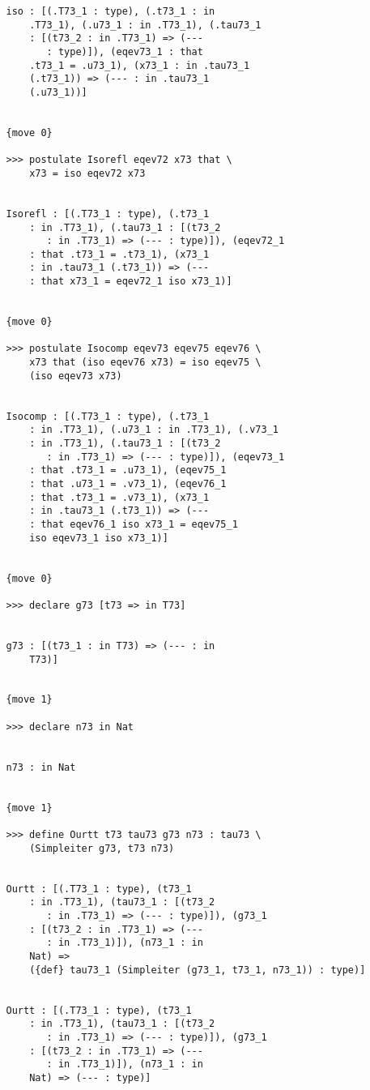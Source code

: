 \documentclass[12pt]{article}
\begin{document}
\begin{verbatim}
   iso : [(.T73_1 : type), (.t73_1 : in 
       .T73_1), (.u73_1 : in .T73_1), (.tau73_1 
       : [(t73_2 : in .T73_1) => (--- 
          : type)]), (eqev73_1 : that 
       .t73_1 = .u73_1), (x73_1 : in .tau73_1 
       (.t73_1)) => (--- : in .tau73_1 
       (.u73_1))]


   {move 0}

   >>> postulate Isorefl eqev72 x73 that \
       x73 = iso eqev72 x73


   Isorefl : [(.T73_1 : type), (.t73_1 
       : in .T73_1), (.tau73_1 : [(t73_2 
          : in .T73_1) => (--- : type)]), (eqev72_1 
       : that .t73_1 = .t73_1), (x73_1 
       : in .tau73_1 (.t73_1)) => (--- 
       : that x73_1 = eqev72_1 iso x73_1)]


   {move 0}

   >>> postulate Isocomp eqev73 eqev75 eqev76 \
       x73 that (iso eqev76 x73) = iso eqev75 \
       (iso eqev73 x73)


   Isocomp : [(.T73_1 : type), (.t73_1 
       : in .T73_1), (.u73_1 : in .T73_1), (.v73_1 
       : in .T73_1), (.tau73_1 : [(t73_2 
          : in .T73_1) => (--- : type)]), (eqev73_1 
       : that .t73_1 = .u73_1), (eqev75_1 
       : that .u73_1 = .v73_1), (eqev76_1 
       : that .t73_1 = .v73_1), (x73_1 
       : in .tau73_1 (.t73_1)) => (--- 
       : that eqev76_1 iso x73_1 = eqev75_1 
       iso eqev73_1 iso x73_1)]


   {move 0}

   >>> declare g73 [t73 => in T73]


   g73 : [(t73_1 : in T73) => (--- : in 
       T73)]


   {move 1}

   >>> declare n73 in Nat


   n73 : in Nat


   {move 1}

   >>> define Ourtt t73 tau73 g73 n73 : tau73 \
       (Simpleiter g73, t73 n73)


   Ourtt : [(.T73_1 : type), (t73_1 
       : in .T73_1), (tau73_1 : [(t73_2 
          : in .T73_1) => (--- : type)]), (g73_1 
       : [(t73_2 : in .T73_1) => (--- 
          : in .T73_1)]), (n73_1 : in 
       Nat) => 
       ({def} tau73_1 (Simpleiter (g73_1, t73_1, n73_1)) : type)]


   Ourtt : [(.T73_1 : type), (t73_1 
       : in .T73_1), (tau73_1 : [(t73_2 
          : in .T73_1) => (--- : type)]), (g73_1 
       : [(t73_2 : in .T73_1) => (--- 
          : in .T73_1)]), (n73_1 : in 
       Nat) => (--- : type)]



\end{verbatim}
\end{document}
